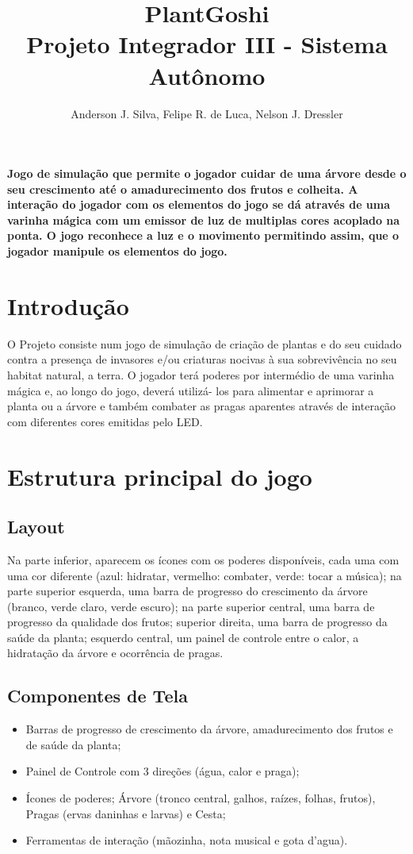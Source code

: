 \documentclass[12pt]{article}
\title{PlantGoshi\\ Projeto Integrador III - Sistema Aut\^onomo}
\author{Anderson J. Silva, Felipe R. de Luca, Nelson J. Dressler }
\begin{document}
 

\maketitle
     
\begin{resumo} 
\textbf{
Jogo de simula\c c\~ao que permite o jogador cuidar de uma \'arvore desde o seu crescimento at\'e
o amadurecimento dos frutos e colheita. A intera\c c\~ao do jogador com os elementos do jogo
se d\'a atrav\'es de uma varinha m\'agica com um emissor de luz de multiplas cores acoplado na ponta.
O jogo reconhece a luz e o movimento permitindo assim, que o jogador manipule os elementos do jogo.}
\end{resumo}

\section{Introdu\c c\~ao}

 O Projeto consiste num jogo de simula\c c\~ao de cria\c c\~ao
 de plantas e do seu cuidado contra a presen\c ca de invasores e/ou criaturas nocivas \`a sua
 sobreviv\^encia no seu habitat natural, a terra.
 O jogador ter\'a poderes por interm\'edio de uma varinha m\'agica e, ao longo do jogo, dever\'a utiliz\'a- los para alimentar e
 aprimorar a planta ou a \'arvore e tamb\'em combater as pragas aparentes atrav\'es
 de intera\c c\~ao com diferentes cores emitidas pelo LED.
 
\section{Estrutura principal do jogo}
\subsection{Layout}
Na parte inferior, aparecem os \'icones com os poderes dispon\'iveis, cada uma com uma cor diferente
(azul: hidratar, vermelho: combater, verde: tocar a m\'usica); na parte superior esquerda,
uma barra de progresso do crescimento da \'arvore (branco, verde claro, verde escuro);
na parte superior central, uma barra de progresso da qualidade dos frutos; superior direita,
uma barra de progresso da sa\'ude da planta; esquerdo central, um painel de controle entre o calor,
a hidrata\c c\~ao da \'arvore e ocorr\^encia de pragas.

\subsection{Componentes de Tela}
\begin{itemize}
\item Barras de progresso de crescimento da \'arvore, amadurecimento dos frutos e de sa\'ude da planta;
\item Painel de Controle com 3 dire\c c\~oes (\'agua, calor e praga);
\item \'Icones de poderes; \'Arvore (tronco central, galhos, ra\'izes, folhas, frutos), Pragas (ervas daninhas e larvas) e Cesta;
\item Ferramentas de intera\c c\~ao (m\~aozinha, nota musical e gota d'agua).
\end{itemize}
\end{document}

